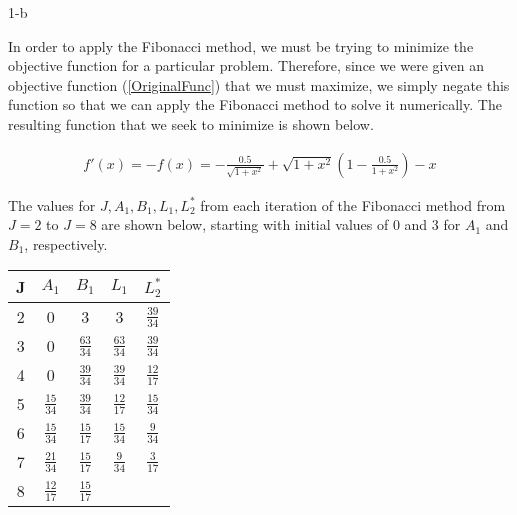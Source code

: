 \documentclass[11pt]{article}
\begin{document}
\begin{prob}{1-b}
\end{prob}
\begin{sol} 

In order to apply the Fibonacci method, we must be trying to minimize the objective function for a particular problem. Therefore, since we were given an objective function (\ref{OriginalFunc}) that we must maximize, we simply negate this function so that we can apply the Fibonacci method to solve it numerically. The resulting function that we seek to minimize is shown below.

\begin{eqnarray*}
f'(x) = -f(x) =-\frac{0.5}{\sqrt{1+x^2}}+\sqrt{1+x^2} \left(1-\frac{0.5}{1+x^2}\right)-x 
\end{eqnarray*}

The values for $J, A_{1}, B_{1}, L_{1}, L_{2}^*$ from each iteration of the Fibonacci method from $J=2$ to $J=8$ are shown below, starting with initial values of $0$ and $3$ for $A_{1}$ and $B_{1}$, respectively.

\begin{center}
  \begin{tabular}{| c | c | c | c | c |}
    \hline
	J & $A_{1}$ & $B_{1}$ & \textbf{$L_{1}$} & \textbf{$L_{2}^{*}$} \\ \hline
	2 & 0 & 3 & 3 & $\frac{39}{34}$ \\ \hline
	3 & 0 & $\frac{63}{34}$ & $\frac{63}{34}$ & $\frac{39}{34}$ \\ \hline
	4 & 0 & $\frac{39}{34}$ & $\frac{39}{34}$ & $\frac{12}{17}$ \\ \hline
	5 & $\frac{15}{34}$ & $\frac{39}{34}$ & $\frac{12}{17}$ & $\frac{15}{34}$ \\ \hline
	6 & $\frac{15}{34}$ & $\frac{15}{17}$ & $\frac{15}{34}$ & $\frac{9}{34}$ \\ \hline
	7 & $\frac{21}{34}$ & $\frac{15}{17}$ & $\frac{9}{34}$ & $\frac{3}{17}$ \\ \hline
	8 & $\frac{12}{17}$ & $\frac{15}{17}$ 
  \end{tabular}
\end{center}

\end{sol}
\end{document}
